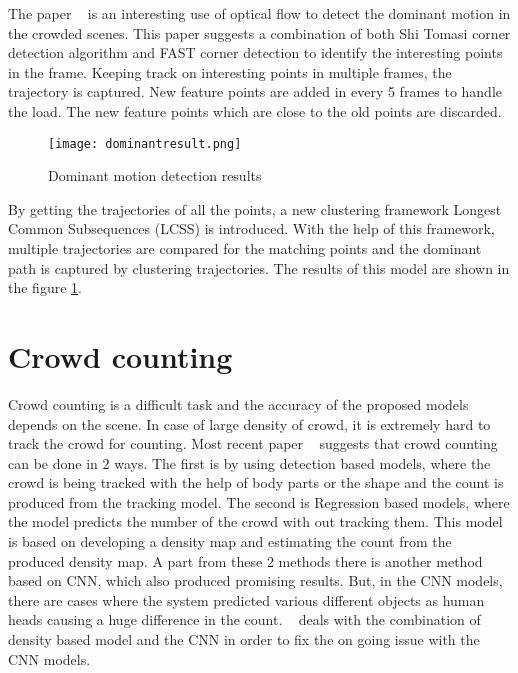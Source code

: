The paper ~\cite{cheriyadat2008detecting} is an interesting use of optical flow to detect the dominant 
motion in the crowded scenes. This paper suggests a combination of both Shi Tomasi corner detection 
algorithm and FAST corner detection to identify the  interesting points in the frame. Keeping track on 
interesting points in multiple frames, the trajectory is captured. New feature points are added in every 5 
frames to handle the load. The new feature points which are close to the old points are discarded. 
\begin{figure}[tb]
	\center\texttt{[image: dominantresult.png]}
	\caption{Dominant motion detection results ~\cite{cheriyadat2008detecting}}
	\label{fig:dominantresult}
\end{figure}
By getting the trajectories of all the points, a new clustering framework Longest Common Subsequences 
(LCSS) is introduced. With the help of this framework, multiple trajectories are compared for the 
matching points and the dominant path is captured by clustering trajectories. The results of this model 
are shown in the figure \ref{fig:dominantresult}.

\section{Crowd counting}
Crowd counting is a difficult task and the accuracy of the proposed models depends on the scene. In 
case of large density of crowd, it is extremely hard to track the crowd for counting. Most recent paper 
~\cite{chen2020crowd} suggests that crowd counting can be done in 2 ways. The first is by using 
detection based models, where the crowd is being tracked with the help of body parts or the shape and 
the count is produced from the tracking model. The second is Regression based models, where the 
model predicts the number of the crowd with out tracking them. This model is based on developing a 
density map and estimating the count from the produced density map. A part from these 2 methods 
there is another method based on CNN, which also produced promising results. But, in the CNN 
models, there are cases where the system predicted various different objects as human heads causing 
a huge difference in the count.  ~\cite{chen2020crowd} deals with the combination of density based 
model and the CNN in order to fix the on going issue with the CNN models.

